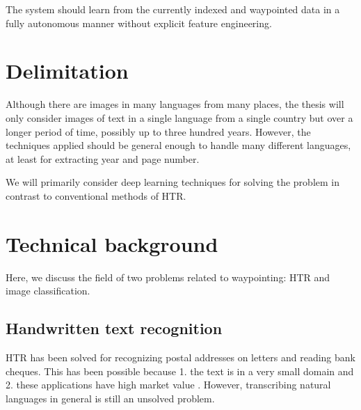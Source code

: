 The system should learn from the currently indexed and waypointed data in a fully autonomous manner without explicit feature engineering.



\section{Delimitation}

Although there are images in many languages from many places, the thesis will only consider images of text in a single language from a single country but over a longer period of time, possibly up to three hundred years.
However, the techniques applied should be general enough to handle many different languages, at least for extracting year and page number.

We will primarily consider deep learning techniques for solving the problem in contrast to conventional methods of HTR.

\section{Technical background}

Here, we discuss the field of two problems related to waypointing: HTR and image classification.

\subsection{Handwritten text recognition}

HTR has been solved for recognizing postal addresses on letters and reading bank cheques. This has been possible because 1. the text is in a very small domain and 2. these applications have high market value \cite{40_years_HWR}. However, transcribing natural languages in general is still an unsolved problem.

